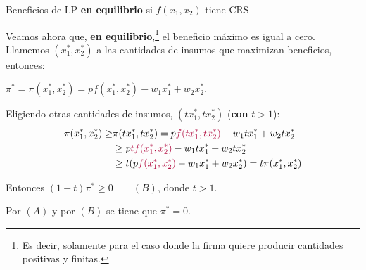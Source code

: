 \documentclass{beamer}
\theoremstyle{definition}
\begin{document}
\begin{frame}{ Beneficios de LP \textbf{en equilibrio} si $f(x_1,x_2)$ tiene CRS}

Veamos ahora que, \textbf{en equilibrio},\footnote{Es decir, solamente para el caso donde la firma quiere producir cantidades positivas y finitas.} el beneficio máximo es igual a cero.  Llamemos $(x_1^*, x_2^*)$ a las cantidades de insumos que maximizan beneficios, entonces: 
\begin{center}
$\pi ^{\ast }=\pi(x_1^{\ast },x_2^{\ast })=pf(x_1^{\ast },x_2^{\ast })-w_1x_1^{\ast }+w_2x_2^{\ast }$. 
\end{center}

Eligiendo otras cantidades de insumos, $(tx_1^*,tx_2^{\ast })$ (\textbf{con} $t>1$): \begin{align*}
    \pi(x_1^{\ast },x_2^{\ast }) \geq &\pi(tx_1^{\ast },tx_2^{\ast })=p\color{rosee}f(tx_1^{\ast },tx_2^{\ast })\color{black}-w_1tx_1^{\ast }+w_2tx_2^{\ast }\\
    &\geq p\color{rosee}tf(x_1^{\ast },x_2^{\ast })\color{black}-w_1tx_1^{\ast }+w_2tx_2^{\ast }\\
    &\geq t( p\color{rosee}f(x_1^{\ast },x_2^{\ast })\color{black}-w_1x_1^{\ast }+w_2x_2^{\ast })=t\pi(x_1^*,x_2^*)\end{align*}

Entonces  $(1-t)\pi^* \geq 0 \qquad (B)$, donde $t>1$.

Por $(A)$ y por $(B)$ se tiene que $\pi^*=0$.

\end{frame}
\end{document}

